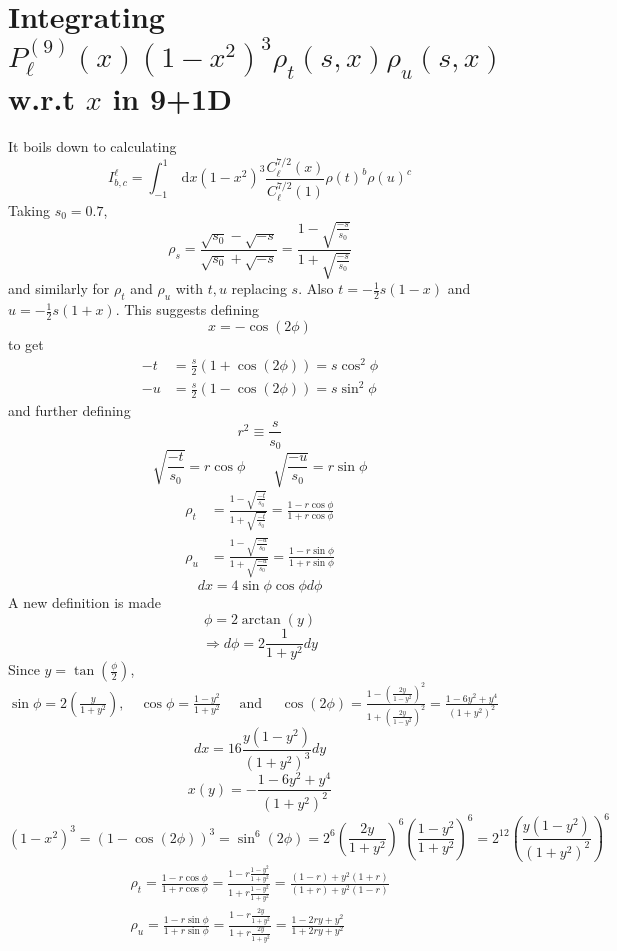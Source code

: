 ﻿\documentclass[12pt,a4paper]{article}
\begin{document}
\section{Integrating $P^{(9)}_{\ell}(x) (1-x^{2})^{3}\rho_{t}(s,x) \rho_{u}(s,x)$ w.r.t $x$ in 9+1D}
It boils down to calculating
$$
I_{b, c}^{\ell}=\int_{-1}^{1} \mathrm{~d} x  (1-x^{2})^{3}\frac{C^{7/2}_{\ell}(x)}{C^{7/2}_{\ell}(1)} \rho(t)^{b} \rho(u)^{c}
$$
Taking $s_{0}=0.7$,
$$
\rho_{s}=\frac{\sqrt{s_{0}}-\sqrt{-s}}{\sqrt{s_{0}}+\sqrt{-s}}=\frac{1-\sqrt{\frac{-s}{s_{0}}}}{1+\sqrt{\frac{-s}{s_{0}}}}
$$
and similarly for $\rho_{t}$ and $\rho_{u}$ with $t,u$ replacing $s$. Also $t=-\frac{1}{2}s(1-x)$ and $u=-\frac{1}{2}s(1+x)$. This suggests defining
$$
x=- \cos (2 \phi)
$$
to get 
$$
\begin{aligned}
-t&=\frac{s}{2}\left( 1+ \cos (2 \phi) \right)=s \cos^{2}\phi \\
-u&=\frac{s}{2}\left( 1- \cos (2 \phi) \right)=s \sin^{2}\phi
\end{aligned}
$$
and further defining 
$$
r^{2} \equiv \frac{s}{s_{0}}
$$
$$
\sqrt{\frac{-t}{s_{0}}}=r \cos \phi \qquad \sqrt{\frac{-u}{s_{0}}}=r \sin \phi
$$
$$
\begin{aligned}
\rho_{t}&=\frac{1-\sqrt{\frac{-t}{s_{0}}}}{1+\sqrt{\frac{-t}{s_{0}}}}=\frac{1-r \cos \phi}{1+r \cos \phi}\\
\rho_{u}&=\frac{1-\sqrt{\frac{-u}{s_{0}}}}{1+\sqrt{\frac{-u}{s_{0}}}}=\frac{1-r \sin \phi}{1+r \sin \phi}
\end{aligned}
$$
$$
dx=4 \sin \phi \cos \phi d\phi
$$
A new definition is made
$$
\phi=2 \arctan (y)
$$
$$
 \Rightarrow d \phi=2 \frac{1}{1+y^{2}} d y
$$
Since $y=\tan \left(\frac{\phi}{2} \right)$, \quad $\sin \phi=2 \left( \frac{y}{1+y^{2}}\right), \quad \cos \phi=\frac{1-y^{2}}{1+y^{2}} \quad \text{ and } \quad \cos(2\phi)=\frac{1-\left(\frac{2 y}{1-y^{2}}\right)^{2}}{1+\left(\frac{2 y}{1-y^{2}}\right)^{2}}=\frac{1-6 y^{2}+y^{4}}{\left(1+y^{2}\right)^{2}}$
$$
d x=16 \frac{y\left(1-y^{2}\right)}{\left(1+y^{2}\right)^{3}} d y
$$
$$
x(y)=- \frac{1-6 y^{2}+y^{4}}{\left(1+y^{2}\right)^{2}}
$$
$$
(1-x^{2})^{3}=(1-\cos(2\phi))^{3}=\sin^{6}(2\phi)=2^{6}\left( \frac{2y}{1+y^{2}} \right)^{6} \left(\frac{1-y^{2}}{1+y^{2}} \right)^{6}=2^{12} \left(\frac{y(1-y^{2})}{(1+y^{2})^{2}} \right)^{6}
$$
$$
\begin{gathered}
\rho_{t}=\frac{1-r \cos \phi}{1+r \cos \phi}=\frac{1-r \frac{1-y^{2}}{1+y^{2}}}{1+r \frac{1-y^{2}}{1+y^{2}}}=\frac{(1-r)+y^{2}(1+r)}{(1+r)+y^{2}(1-r)} \\
\rho_{u}=\frac{1-r \sin \phi}{1+r \sin \phi}=\frac{1-r \frac{2 y}{1+y^{2}}}{1+r \frac{2 y}{1+y^{2}}}=\frac{1-2 r y+y^{2}}{1+2 r y+y^{2}}
\end{gathered}
$$
\end{document}
